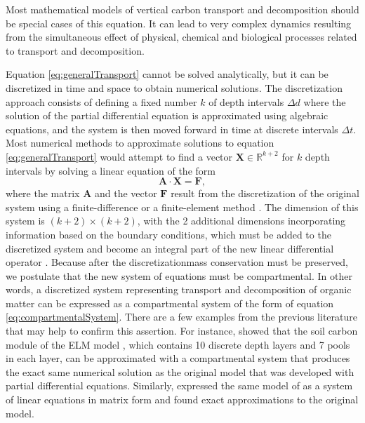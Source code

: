 \documentclass[11pt, oneside, a4paper]{article}   	%
\providecommand{\DIFaddtex}[1]{{\protect\color{blue}\uwave{#1}}} %
\providecommand{\DIFaddbegin}{} %
\providecommand{\DIFaddend}{} %
\providecommand{\DIFadd}[1]{\texorpdfstring{\DIFaddtex{#1}}{#1}} %
\newcommand{\DIFaddincludegraphics}[2][]{{\color{blue}\fbox{\DIFOincludegraphics[#1]{#2}}}} %
\DeclareRobustCommand{\DIFaddbegin}{\DIFOaddbegin \let\includegraphics\DIFaddincludegraphics} %
\DeclareRobustCommand{\DIFaddend}{\DIFOaddend \let\includegraphics\DIFOincludegraphics} %
\begin{document}
Most mathematical models of vertical carbon transport and decomposition should be special cases of this equation. It can lead to very complex dynamics resulting from the simultaneous effect of physical, chemical and biological processes related to transport and decomposition. 

Equation \ref{eq:generalTransport} cannot be solved analytically, but it can be discretized in time and space to obtain numerical solutions. The discretization approach consists of defining a fixed number $k$ of depth intervals $\Delta d$ where the solution of the partial differential equation is approximated using algebraic equations, and the system is then moved forward in time at discrete intervals $\Delta t$. Most numerical methods to approximate solutions to equation \ref{eq:generalTransport} would attempt to find a vector $\bm{X} \in \mathbb{R}^{k+2}$ for $k$ depth intervals by solving a linear equation of the form
\begin{equation} \label{eq:discreteSystem}
\mathbf{A} \cdot \bm{X} = \bm{F},
\end{equation}
where the matrix $\mathbf{A}$ and the vector $\bm{F}$ result from the discretization of the original system using a finite-difference or a finite-element method \citep{Lanczos,LeVeque2007}. The dimension of this system is $(k+2) \times (k+2)$, with the 2 additional dimensions incorporating information based on the boundary conditions, which must be added to the discretized system and become an integral part of the new linear differential operator \citep{Lanczos}. Because after the discretization\DIFaddbegin \DIFadd{, }\DIFaddend mass conservation must be preserved, we postulate that the new system of equations must be compartmental. In other words, a discretized system representing transport and decomposition of organic matter can be expressed as a compartmental system of the form of equation \ref{eq:compartmentalSystem}. There are a few examples from the previous literature that may help to confirm this assertion. For instance, \citet{Metzler2020JAMES} showed that the soil carbon module of the ELM model \citep{Koven2013BGS}, which contains 10 discrete depth layers and 7 pools in each layer, can be approximated with a compartmental system that produces the exact same numerical solution as the original model that was developed with partial differential equations. Similarly, \citep{Huang2018} expressed the same model of \citet{Koven2013BGS} as a system of linear equations in matrix form and found exact approximations to the original model.
\end{document}
